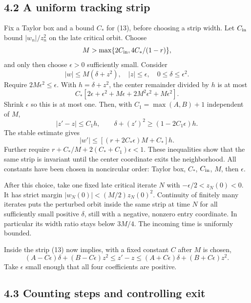 \documentclass[11pt,letterpaper]{article}
\begin{document}
\subsection{4.2 A uniform tracking
strip}\label{a-uniform-tracking-strip}

Fix a Taylor box and a bound \(C_*\) for (13), before choosing a strip
width. Let \(C_{\rm in}\) bound \(|w_n|/z_n^2\) on the late critical
orbit. Choose \[M>\max\{2C_{\rm in},4C_* /(1-r)\},\] and only then
choose \(\epsilon>0\) sufficiently small. Consider
\[|w|\le M(\delta+z^2),\quad |z|\le\epsilon,\quad0\le\delta\le\epsilon^2.\]
Require \(2M\epsilon^2\le\epsilon\). With \(h=\delta+z^2\), the center
remainder divided by \(h\) is at most
\[C_*[2\epsilon+\epsilon^2+M\epsilon+2M^2\epsilon^2+M\epsilon^2].\]
Shrink \(\epsilon\) so this is at most one. Then, with
\(C_1=\max(A,B)+1\) independent of \(M\),
\[|z'-z|\le C_1h,\qquad \delta+(z')^2\ge(1-2C_1\epsilon)h.\] The stable
estimate gives \[|w'|\le[(r+2C_*\epsilon)M+C_*]h.\] Further require
\(r+C_*/M+2(C_*+C_1)\epsilon<1\). These inequalities show that the same
strip is invariant until the center coordinate exits the neighborhood.
All constants have been chosen in noncircular order: Taylor box,
\(C_*\), \(C_{\rm in}\), \(M\), then \(\epsilon\).

After this choice, take one fixed late critical iterate \(N\) with
\(-\epsilon/2<z_N(0)<0\). It has strict margin
\(|w_N(0)|<(M/2)z_N(0)^2\). Continuity of finitely many iterates puts
the perturbed orbit inside the same strip at time \(N\) for all
sufficiently small positive \(\delta\), still with a negative, nonzero
entry coordinate. In particular its width ratio stays below \(3M/4\).
The incoming time is uniformly bounded.

Inside the strip (13) now implies, with a fixed constant \(C\) after
\(M\) is chosen, \[
 (A-C\epsilon)\delta+(B-C\epsilon)z^2
 \le z'-z\le
 (A+C\epsilon)\delta+(B+C\epsilon)z^2.                        \tag{14}
\] Take \(\epsilon\) small enough that all four coefficients are
positive.

\subsection{4.3 Counting steps and controlling
exit}\label{counting-steps-and-controlling-exit}
\end{document}
